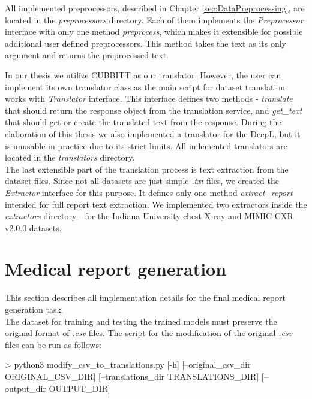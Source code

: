 All implemented preprocessors, described in Chapter \ref{sec:DataPreprocessing}, are located in the \textit{preprocessors} directory. Each of them implements the  \textit{Preprocessor} interface with only one method \textit{preprocess}, which makes it extensible for possible additional user defined preprocessors. This method takes the text as its only argument and returns the preprocessed text.\\
\newpage

In our thesis we utilize CUBBITT as our translator. However, the user can implement its own translator class as the main script for dataset translation works with \textit{Translator} interface. This interface defines two methods - \textit{translate} that should return the response object from the translation service, and \textit{get\_text} that should get or create the translated text from the response. During the elaboration of this thesis we also implemented a translator for the DeepL, but it is unusable in practice due to its strict limits. All imlemented translators are located in the \textit{translators} directory.\\

The last extensible part of the translation process is text extraction from the dataset files. Since not all datasets are just simple \textit{.txt} files, we created the \textit{Extractor} interface for this purpose. It defines only one method \textit{extract\_report} intended for full report text extraction. We implemented two extractors inside the \textit{extractors} directory - for the Indiana University chest X-ray and MIMIC-CXR v2.0.0 datasets.

\section{Medical report generation}
\label{sec:MedRepGenImpl}
This section describes all implementation details for the final medical report generation task. \\

The dataset for training and testing the trained models must preserve the original format of \textit{.csv} files. The script for the modification of the original \textit{.csv} files can be run as follows:
\begin{code}
> python3 modify_csv_to_translations.py [-h] 
                                [--original_csv_dir ORIGINAL_CSV_DIR] 
                                [--translations_dir TRANSLATIONS_DIR]
                                [--output_dir OUTPUT_DIR]
\end{code}

